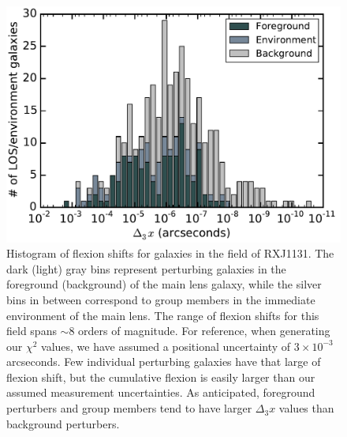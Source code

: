 \documentclass{emulateapj}
\begin{document}
\begin{figure}[!h]
\begin{center}
\includegraphics[width=1\columnwidth]{RXJ1131_dx3_hist.pdf}
\caption{\label{fig:d3xhist} Histogram of flexion shifts for galaxies in the field of RXJ1131.  The dark (light) gray bins represent perturbing galaxies in the foreground (background) of the main lens galaxy, while the silver bins in between correspond to group members in the immediate environment of the main lens. The range of flexion shifts for this field spans $\sim 8$ orders of magnitude. For reference, when generating our $\chi^2$ values, we have assumed a positional uncertainty of $3 \times 10^{-3}$ arcseconds. Few individual perturbing galaxies have that large of flexion shift, but the cumulative flexion is easily larger than our assumed measurement uncertainties. As anticipated, foreground perturbers and group members tend to have larger $\Delta_3 x$ values than background perturbers.%
}
\end{center}
\end{figure}
\end{document}
